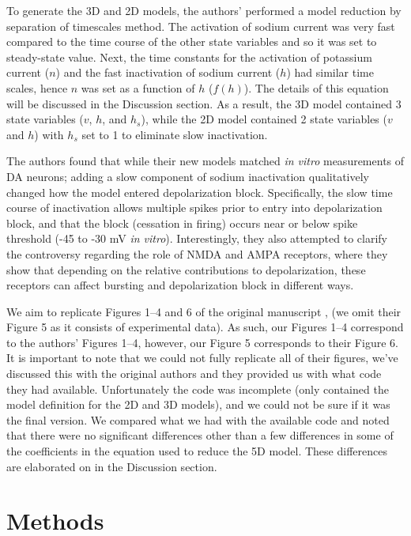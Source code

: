 To generate the 3D and 2D models, the authors’ performed a model reduction by separation of timescales method. The activation of sodium current was very fast compared to the time course of the other state variables and so it was set to steady-state value. Next, the time constants for the activation of potassium current ($n$) and the fast inactivation of sodium current ($h$) had similar time scales, hence $n$ was set as a function of $h$ ($f(h)$). The details of this equation will be discussed in the Discussion section. As a result, the 3D model contained 3 state variables ($v$, $h$, and $h_s$), while the 2D model contained 2 state variables ($v$ and $h$) with $h_s$ set to 1 to eliminate slow inactivation. 

The authors found that while their new models matched \emph{in vitro} measurements of DA neurons; adding a slow component of sodium inactivation qualitatively changed how the model entered depolarization block. Specifically, the slow time course of inactivation allows multiple spikes prior to entry into depolarization block, and that the block (cessation in firing) occurs near or below spike threshold (-45 to -30 mV \emph{in vitro}). Interestingly, they also attempted to clarify the controversy regarding the role of NMDA and AMPA receptors, where they show that depending on the relative contributions to depolarization, these receptors can affect bursting and depolarization block in different ways. 

We aim to replicate Figures 1--4 and 6 of the original manuscript \cite{Qian2014}, (we omit their Figure 5 as it consists of experimental data). As such, our Figures 1--4 correspond to the authors' Figures 1--4, however, our Figure 5 corresponds to their Figure 6. It is important to note that we could not fully replicate all of their figures, we've discussed this with the original authors and they provided us with what code they had available. Unfortunately the code was incomplete (only contained the model definition for the 2D and 3D models), and we could not be sure if it was the final version. We compared what we had with the available code and noted that there were no significant differences other than a few differences in some of the coefficients in the equation used to reduce the 5D model. These differences are elaborated on in the Discussion section.



\section{Methods}

